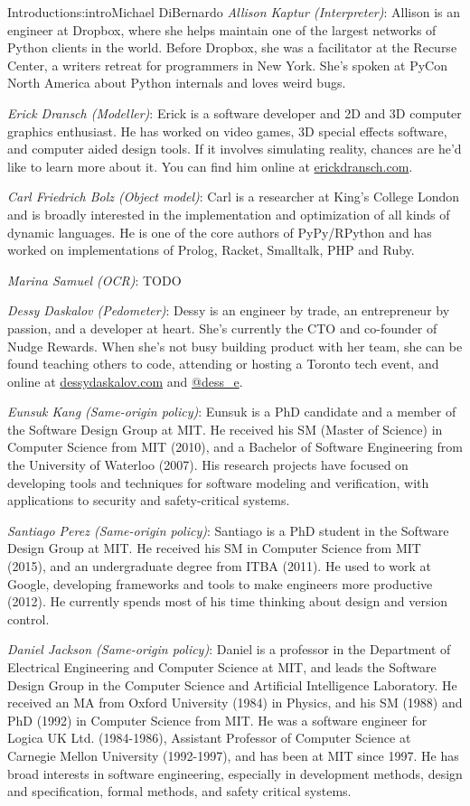 \begin{aosachapter}{Introduction}{s:intro}{Michael DiBernardo}
\emph{Allison Kaptur (Interpreter)}: Allison is an engineer at Dropbox, where she helps maintain one of the largest networks of Python clients in the world. Before Dropbox, she was a facilitator at the Recurse Center, a writers retreat for programmers in New York. She's spoken at PyCon North America about Python internals and loves weird bugs.

\emph{Erick Dransch (Modeller)}: Erick is a software developer and 2D and 3D computer graphics enthusiast. He has worked on video games, 3D special effects software, and computer aided design tools. If it involves simulating reality, chances are he'd like to learn more about it. You can find him online at \url{erickdransch.com}.

\emph{Carl Friedrich Bolz (Object model)}: Carl is a researcher at King's College London and is broadly interested in the implementation and optimization of all kinds of dynamic languages. He is one of the core authors of PyPy/RPython and has worked on implementations of Prolog, Racket, Smalltalk, PHP and Ruby. 

\emph{Marina Samuel (OCR)}: TODO

\emph{Dessy Daskalov (Pedometer)}: Dessy is an engineer by trade, an entrepreneur by passion, and a developer at heart. She's currently the CTO and co-founder of Nudge Rewards. When she’s not busy building product with her team, she can be found teaching others to code, attending or hosting a Toronto tech event, and online at \url{dessydaskalov.com} and \url{@dess_e}.

\emph{Eunsuk Kang (Same-origin policy)}: Eunsuk is a PhD candidate and a member of the Software Design Group at MIT. He received his SM (Master of Science) in Computer Science from MIT (2010), and a Bachelor of Software Engineering from the University of Waterloo (2007). His research projects have focused on developing tools and techniques for software modeling and verification, with applications to security and safety-critical systems.

\emph{Santiago Perez (Same-origin policy)}: Santiago is a PhD student in the Software Design Group at MIT. He received his SM in Computer Science from MIT (2015), and an undergraduate degree from ITBA (2011). He used to work at Google, developing frameworks and tools to make engineers more productive (2012). He currently spends most of his time thinking about design and version control.

\emph{Daniel Jackson (Same-origin policy)}: Daniel is a professor in the Department of Electrical Engineering and Computer Science at MIT, and leads the Software Design Group in the Computer Science and Artificial Intelligence Laboratory. He received an MA from Oxford University (1984) in Physics, and his SM (1988) and PhD (1992) in Computer Science from MIT. He was a software engineer for Logica UK Ltd. (1984-1986), Assistant Professor of Computer Science at Carnegie Mellon University (1992-1997), and has been at MIT since 1997. He has broad interests in software engineering, especially in development methods, design and specification, formal methods, and safety critical systems.


\end{aosachapter}
